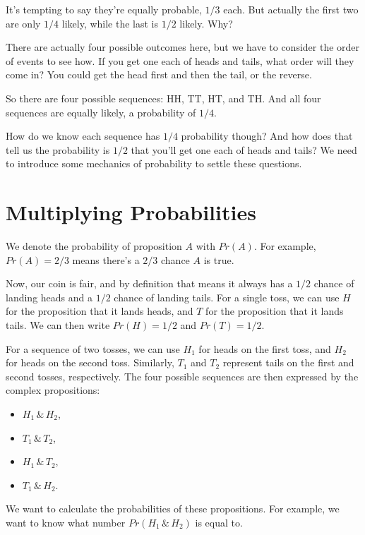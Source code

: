 \documentclass[justified]{tufte-book}
\providecommand{\tightlist}{%
  \setlength{\itemsep}{0pt}\setlength{\parskip}{0pt}}
\theoremstyle{definition}
\theoremstyle{definition}
\theoremstyle{definition}
\theoremstyle{definition}
\theoremstyle{remark}
\begin{document}
It's tempting to say they're equally probable, \(1/3\) each. But actually the first two are only \(1/4\) likely, while the last is \(1/2\) likely. Why?

There are actually four possible outcomes here, but we have to consider the order of events to see how. If you get one each of heads and tails, what order will they come in? You could get the head first and then the tail, or the reverse.

So there are four possible sequences: HH, TT, HT, and TH. And all four sequences are equally likely, a probability of \(1/4\).

How do we know each sequence has \(1/4\) probability though? And how does that tell us the probability is \(1/2\) that you'll get one each of heads and tails? We need to introduce some mechanics of probability to settle these questions.

\hypertarget{multiplying-probabilities}{%
\section{Multiplying Probabilities}\label{multiplying-probabilities}}

We denote the probability of proposition \(A\) with \(Pr(A)\). For example, \(Pr(A)=2/3\) means there's a \(2/3\) chance \(A\) is true.

Now, our coin is fair, and by definition that means it always has a \(1/2\) chance of landing heads and a \(1/2\) chance of landing tails. For a single toss, we can use \(H\) for the proposition that it lands heads, and \(T\) for the proposition that it lands tails. We can then write \(Pr(H) = 1/2\) and \(Pr(T) = 1/2\).

For a sequence of two tosses, we can use \(H_1\) for heads on the first toss, and \(H_2\) for heads on the second toss. Similarly, \(T_1\) and \(T_2\) represent tails on the first and second tosses, respectively. The four possible sequences are then expressed by the complex propositions:

\begin{itemize}
\tightlist
\item
  \(H_1 \,\&\, H_2\),
\item
  \(T_1 \,\&\, T_2\),
\item
  \(H_1 \,\&\, T_2\),
\item
  \(T_1 \,\&\, H_2\).
\end{itemize}

We want to calculate the probabilities of these propositions. For example, we want to know what number \(Pr(H_1 \,\&\, H_2)\) is equal to.
\end{document}
